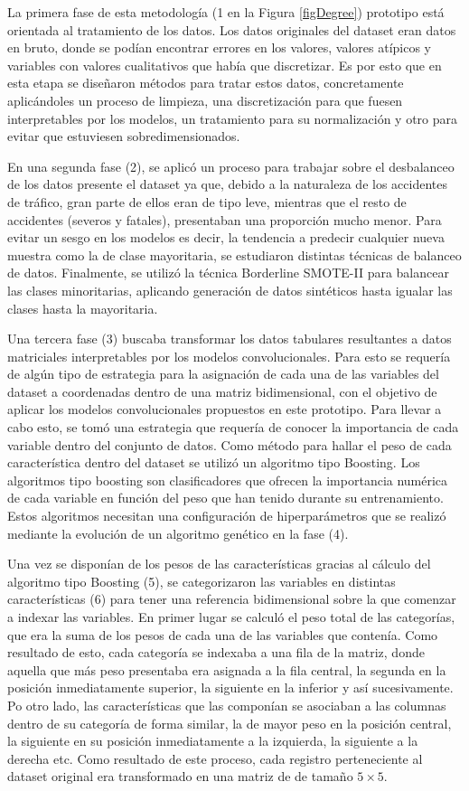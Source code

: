 \documentclass{uathesis-es}
\begin{document}
	La primera fase de esta metodología (1 en la Figura \ref{figDegree}) prototipo está orientada al tratamiento de los datos. Los datos originales del dataset eran datos en bruto, donde se podían encontrar errores en los valores, valores atípicos y variables con valores cualitativos que había que discretizar. Es por esto que en esta etapa se diseñaron métodos para tratar estos datos, concretamente aplicándoles un proceso de limpieza, una discretización para que fuesen interpretables por los modelos, un tratamiento para su normalización y otro para evitar que estuviesen sobredimensionados.
	
	En una segunda fase (2), se aplicó un proceso para trabajar sobre el desbalanceo de los datos presente el dataset ya que, debido a la naturaleza de los accidentes de tráfico, gran parte de ellos eran de tipo leve, mientras que el resto de accidentes (severos y fatales), presentaban una proporción mucho menor. Para evitar un sesgo en los modelos es decir, la tendencia a predecir cualquier nueva muestra como la de clase mayoritaria, se estudiaron distintas técnicas de balanceo de datos. Finalmente, se utilizó la técnica Borderline SMOTE-II para balancear las clases minoritarias, aplicando generación de datos sintéticos hasta igualar las clases hasta la mayoritaria.
	
	Una tercera fase (3) buscaba transformar los datos tabulares resultantes a datos matriciales interpretables por los modelos convolucionales. Para esto se requería de algún tipo de estrategia para la asignación de cada una de las variables del dataset a coordenadas dentro de una matriz bidimensional, con el objetivo de aplicar los modelos convolucionales propuestos en este prototipo. Para llevar a cabo esto, se tomó una estrategia que requería de conocer la importancia de cada variable dentro del conjunto de datos. Como método para hallar el peso de cada característica dentro del dataset se utilizó un algoritmo tipo Boosting. Los algoritmos tipo boosting son clasificadores que ofrecen la importancia numérica de cada variable en función del peso que han tenido durante su entrenamiento. Estos algoritmos necesitan una configuración de hiperparámetros que se realizó mediante la evolución de un algoritmo genético en la fase (4).
	
	Una vez se disponían de los pesos de las características gracias al cálculo del algoritmo tipo Boosting (5), se categorizaron las variables en distintas características (6) para tener una referencia bidimensional sobre la que comenzar a indexar las variables. En primer lugar se calculó el peso total de las categorías, que era la suma de los pesos de cada una de las variables que contenía. Como resultado de esto, cada categoría se indexaba a una fila de la matriz, donde aquella que más peso presentaba era asignada a la fila central, la segunda en la posición inmediatamente superior, la siguiente en la inferior y así sucesivamente. Po otro lado, las características que las componían se asociaban a las columnas dentro de su categoría de forma similar, la de mayor peso en la posición central, la siguiente en su posición inmediatamente a la izquierda, la siguiente a la derecha etc. Como resultado de este proceso, cada registro perteneciente al dataset original era transformado en una matriz de de tamaño $5\times5$.
	
\end{document}
